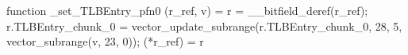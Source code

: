 function _set_TLBEntry_pfn0 (r_ref, v) = {
    r = __bitfield_deref(r_ref);
    r.TLBEntry_chunk_0 = vector_update_subrange(r.TLBEntry_chunk_0, 28, 5, vector_subrange(v, 23, 0));
    (*r_ref) = r
}
